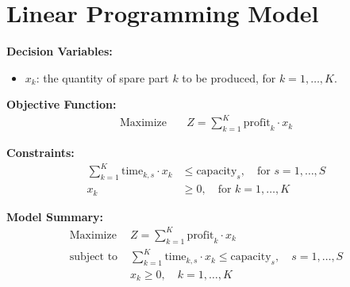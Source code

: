 \documentclass{article}
\begin{document}
\section*{Linear Programming Model}

\textbf{Decision Variables:}
\begin{itemize}
    \item $x_k$: the quantity of spare part $k$ to be produced, for $k = 1, \ldots, K$.
\end{itemize}

\textbf{Objective Function:}
\begin{align*}
    \text{Maximize} & \quad Z = \sum_{k=1}^{K} \text{profit}_k \cdot x_k
\end{align*}

\textbf{Constraints:}
\begin{align*}
    \sum_{k=1}^{K} \text{time}_{k, s} \cdot x_k & \leq \text{capacity}_s, \quad \text{for } s = 1, \ldots, S \\
    x_k & \geq 0, \quad \text{for } k = 1, \ldots, K
\end{align*}

\textbf{Model Summary:}
\begin{align*}
    \text{Maximize } & Z = \sum_{k=1}^{K} \text{profit}_k \cdot x_k \\
    \text{subject to } & \sum_{k=1}^{K} \text{time}_{k, s} \cdot x_k \leq \text{capacity}_s, \quad s = 1, \ldots, S \\
    & x_k \geq 0, \quad k = 1, \ldots, K
\end{align*}
\end{document}
